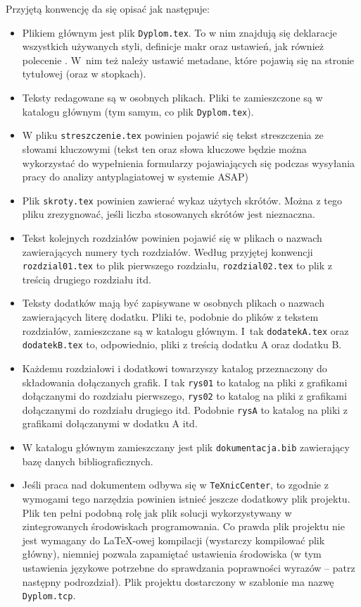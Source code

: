 Przyjętą konwencję da się opisać jak następuje:
\begin{itemize}
\item Plikiem głównym jest plik \texttt{Dyplom.tex}. To w nim znajdują się deklaracje wszystkich używanych styli, definicje makr oraz ustawień, jak również polecenie \verb++. W~nim też należy ustawić metadane, które pojawią się na stronie tytułowej (oraz w stopkach).
\item Teksty redagowane są w osobnych plikach. Pliki te zamieszczone są w katalogu głównym (tym samym, co plik \texttt{Dyplom.tex}).
\item W pliku \texttt{streszczenie.tex} powinien pojawić się tekst streszczenia ze słowami kluczowymi (tekst ten oraz słowa kluczowe będzie można wykorzystać do wypełnienia formularzy pojawiających się podczas wysyłania pracy do analizy antyplagiatowej w systemie ASAP)
\item Plik \texttt{skroty.tex} powinien zawierać wykaz użytych skrótów. Można z tego pliku zrezygnować, jeśli liczba stosowanych skrótów jest nieznaczna. 
\item Tekst kolejnych rozdziałów powinien pojawić się w plikach o nazwach zawierających numery tych rozdziałów. Według przyjętej konwencji \texttt{rozdzial01.tex} to plik pierwszego rozdziału, \texttt{rozdzial02.tex} to plik z treścią drugiego rozdziału itd. 
\item Teksty dodatków mają być zapisywane w osobnych plikach o nazwach zawierających literę dodatku. Pliki te, podobnie do plików z tekstem rozdziałów, zamieszczane są w katalogu głównym. I~tak \texttt{dodatekA.tex} oraz \texttt{dodatekB.tex} to, odpowiednio, pliki z treścią dodatku A oraz dodatku B.
\item Każdemu rozdziałowi i dodatkowi towarzyszy katalog przeznaczony do składowania dołączanych grafik. I tak \texttt{rys01} to katalog na pliki z grafikami dołączanymi do rozdziału pierwszego, \texttt{rys02} to katalog na pliki z grafikami dołączanymi do rozdziału drugiego itd.
Podobnie \texttt{rysA} to katalog na pliki z grafikami dołączanymi w dodatku A itd.
\item W katalogu głównym zamieszczany jest plik \texttt{dokumentacja.bib} zawierający bazę danych bibliograficznych.
\item Jeśli praca nad dokumentem odbywa się w \texttt{TeXnicCenter}, to zgodnie z wymogami tego narzędzia powinien istnieć jeszcze dodatkowy plik projektu. Plik ten pełni podobną rolę jak plik solucji wykorzystywany w zintegrowanych środowiskach programowania. Co prawda plik projektu nie jest wymagany do \LaTeX-owej kompilacji (wystarczy kompilować plik główny), niemniej pozwala zapamiętać ustawienia środowiska (w tym ustawienia językowe potrzebne do sprawdzania poprawności wyrazów -- patrz następny podrozdział).  Plik projektu dostarczony w szablonie ma nazwę \texttt{Dyplom.tcp}. 
\end{itemize}

